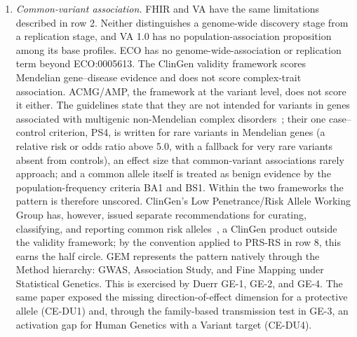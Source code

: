 \begin{enumerate}
  \item \emph{Common-variant association.} FHIR and VA have the same
    limitations described in row 2. Neither distinguishes a genome-wide
    discovery stage from a replication stage, and VA 1.0 has no population-association
    proposition among its base profiles. ECO has no genome-wide-association or replication term
    beyond ECO:0005613. The ClinGen validity framework scores Mendelian
    gene--disease evidence and does not score complex-trait association.
    ACMG/AMP, the framework at the variant level, does not score it either.
    The guidelines state that they are not intended for variants in genes
    associated with multigenic non-Mendelian complex
    disorders~\cite{acmg2015}; their one case--control criterion, PS4, is
    written for rare variants in Mendelian genes (a relative risk or odds
    ratio above 5.0, with a fallback for very rare variants absent from
    controls), an effect size that common-variant associations rarely
    approach; and a common allele itself is treated as benign evidence by
    the population-frequency criteria BA1 and BS1. Within the two
    frameworks the pattern is therefore unscored. ClinGen's Low
    Penetrance/Risk Allele Working Group has, however, issued separate
    recommendations for curating, classifying, and reporting common risk
    alleles~\cite{schmidt2024}, a ClinGen product outside the validity
    framework; by the convention applied to PRS-RS in row 8, this earns the
    half circle.
    GEM represents the pattern natively through the Method hierarchy:
    GWAS, Association Study, and Fine Mapping under Statistical Genetics.
    This is exercised by Duerr GE-1, GE-2, and GE-4. The same paper exposed
    the missing direction-of-effect dimension for a protective allele
    (CE-DU1) and, through the family-based transmission test in GE-3, an
    activation gap for Human Genetics with a Variant target (CE-DU4).


\end{enumerate}
